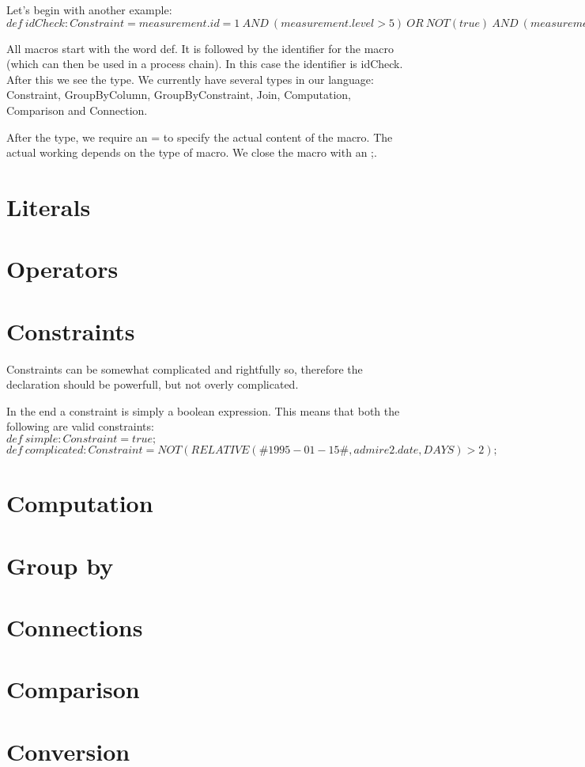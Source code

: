 \documentclass[a4paper]{article}
\begin{document}
Let's begin with another example: \\

$def\ idCheck : Constraint = measurement.id = 1\ AND\ (measurement.level > 5)\ OR\ NOT(true)\ AND\ (measurement.level > measurement.value);$

All macros start with the word def. It is followed by the identifier for the macro (which can then be used in a process chain). In this case the identifier is idCheck. After this we see the type. We currently have several types in our language: Constraint, GroupByColumn, GroupByConstraint, Join, Computation, Comparison and Connection.

After the type, we require an = to specify the actual content of the macro. The actual working depends on the type of macro. We close the macro with an ;.

\section{Literals}


\section{Operators}


\section{Constraints}
Constraints can be somewhat complicated and rightfully so, therefore the declaration should be powerfull, but not overly complicated.

In the end a constraint is simply a boolean expression. This means that both the following are valid constraints: \\

$def\ simple : Constraint = true;$ \\

$def\ complicated : Constraint = NOT(RELATIVE(\#1995-01-15\#, admire2.date, DAYS) > 2);$

\section{Computation}


\section{Group by}


\section{Connections}


\section{Comparison}

\section{Conversion}

\end{document}
